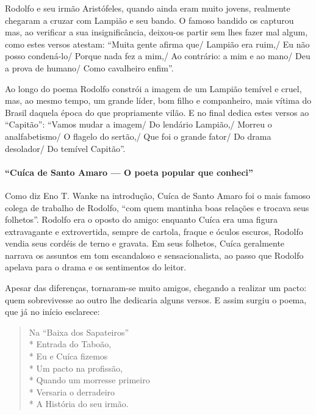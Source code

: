 Rodolfo e seu irmão Aristófeles, quando ainda eram muito jovens,
realmente chegaram a cruzar com Lampião e seu bando. O famoso bandido
os capturou mas, ao verificar a sua insignificância, deixou-os partir
sem lhes fazer mal algum, como estes versos atestam: “Muita gente
afirma que/ Lampião era ruim,/ Eu não posso condená-lo/ Porque nada fez
a mim,/ Ao contrário: a mim e ao mano/ Deu a prova de humano/ Como
cavalheiro enfim”.

Ao longo do poema Rodolfo constrói a imagem de um Lampião temível e
cruel, mas, ao mesmo tempo, um grande líder, bom filho e companheiro,
mais vítima do Brasil daquela época do que propriamente vilão. E no
final dedica estes versos ao “Capitão”: “Vamos mudar a imagem/ Do
lendário Lampião,/ Morreu o analfabetismo/ O flagelo do sertão,/ Que
foi o grande fator/ Do drama desolador/ Do temível Capitão”.

\paragraph{“Cuíca de Santo Amaro — O poeta popular que conheci”}

Como diz Eno T. Wanke na introdução, Cuíca de Santo Amaro foi o mais
famoso colega de trabalho de Rodolfo, “com quem mantinha boas relações
e trocava seus folhetos”. Rodolfo era o oposto do amigo: enquanto Cuíca
era uma figura extravagante e extrovertida, sempre de cartola, fraque e
óculos escuros, Rodolfo vendia seus cordéis de terno e gravata. Em seus
folhetos, Cuíca geralmente narrava os assuntos em tom escandaloso e
sensacionalista, ao passo que Rodolfo apelava para o drama e os
sentimentos do leitor.

Apesar das diferenças, tornaram-se muito amigos, chegando a realizar um
pacto: quem sobrevivesse ao outro lhe dedicaria alguns versos. E assim
surgiu o poema, que já no início esclarece:


\begin{verse}

Na “Baixa dos Sapateiros”\\*
Entrada do Taboão,\\*
Eu e Cuíca fizemos\\*
Um pacto na profissão,\\*
Quando um morresse primeiro\\*
Versaria o derradeiro\\*
A História do seu irmão.

\end{verse}

